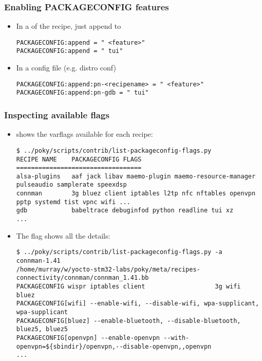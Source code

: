 \begin{frame}[fragile]
  \frametitle{Enabling PACKAGECONFIG features}
  \begin{itemize}
    \item In a  of the recipe, just append to 
      \begin{block}{}
        \begin{verbatim}
PACKAGECONFIG:append = " <feature>"
PACKAGECONFIG:append = " tui"
        \end{verbatim}
      \end{block}

    \item In a config file (e.g. distro conf)
      \begin{block}{}
        \begin{verbatim}
PACKAGECONFIG:append:pn-<recipename> = " <feature>"
PACKAGECONFIG:append:pn-gdb = " tui"
        \end{verbatim}
      \end{block}
  \end{itemize}
\end{frame}

\begin{frame}[fragile]
  \frametitle{Inspecting available  flags}
  \begin{itemize}
  \item {}
    shows the  varflags available for each recipe:

      \begin{block}{}
        \begin{verbatim}
$ ../poky/scripts/contrib/list-packageconfig-flags.py
RECIPE NAME    PACKAGECONFIG FLAGS
==================================
alsa-plugins   aaf jack libav maemo-plugin maemo-resource-manager pulseaudio samplerate speexdsp
connman        3g bluez client iptables l2tp nfc nftables openvpn pptp systemd tist vpnc wifi ...
gdb            babeltrace debuginfod python readline tui xz
...
        \end{verbatim}
      \end{block}

    \item The  flag shows all the details:
      \begin{block}{}
        \begin{verbatim}
$ ../poky/scripts/contrib/list-packageconfig-flags.py -a
connman-1.41
/home/murray/w/yocto-stm32-labs/poky/meta/recipes-connectivity/connman/connman_1.41.bb
PACKAGECONFIG wispr iptables client                   3g wifi                    bluez
PACKAGECONFIG[wifi] --enable-wifi, --disable-wifi, wpa-supplicant, wpa-supplicant
PACKAGECONFIG[bluez] --enable-bluetooth, --disable-bluetooth, bluez5, bluez5
PACKAGECONFIG[openvpn] --enable-openvpn --with-openvpn=${sbindir}/openvpn,--disable-openvpn,,openvpn
...
        \end{verbatim}
      \end{block}
  \end{itemize}
\end{frame}

